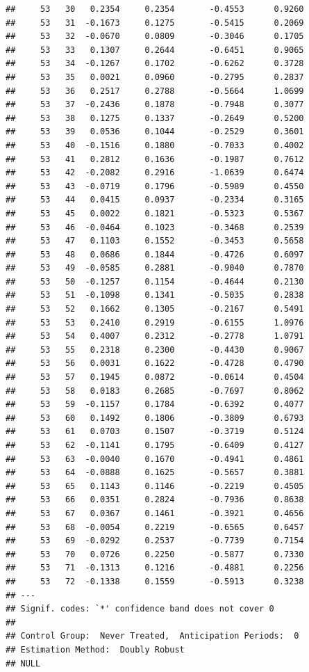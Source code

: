 \documentclass[
]{article}
\begin{document}
\begin{verbatim}
##     53   30   0.2354     0.2354       -0.4553      0.9260  
##     53   31  -0.1673     0.1275       -0.5415      0.2069  
##     53   32  -0.0670     0.0809       -0.3046      0.1705  
##     53   33   0.1307     0.2644       -0.6451      0.9065  
##     53   34  -0.1267     0.1702       -0.6262      0.3728  
##     53   35   0.0021     0.0960       -0.2795      0.2837  
##     53   36   0.2517     0.2788       -0.5664      1.0699  
##     53   37  -0.2436     0.1878       -0.7948      0.3077  
##     53   38   0.1275     0.1337       -0.2649      0.5200  
##     53   39   0.0536     0.1044       -0.2529      0.3601  
##     53   40  -0.1516     0.1880       -0.7033      0.4002  
##     53   41   0.2812     0.1636       -0.1987      0.7612  
##     53   42  -0.2082     0.2916       -1.0639      0.6474  
##     53   43  -0.0719     0.1796       -0.5989      0.4550  
##     53   44   0.0415     0.0937       -0.2334      0.3165  
##     53   45   0.0022     0.1821       -0.5323      0.5367  
##     53   46  -0.0464     0.1023       -0.3468      0.2539  
##     53   47   0.1103     0.1552       -0.3453      0.5658  
##     53   48   0.0686     0.1844       -0.4726      0.6097  
##     53   49  -0.0585     0.2881       -0.9040      0.7870  
##     53   50  -0.1257     0.1154       -0.4644      0.2130  
##     53   51  -0.1098     0.1341       -0.5035      0.2838  
##     53   52   0.1662     0.1305       -0.2167      0.5491  
##     53   53   0.2410     0.2919       -0.6155      1.0976  
##     53   54   0.4007     0.2312       -0.2778      1.0791  
##     53   55   0.2318     0.2300       -0.4430      0.9067  
##     53   56   0.0031     0.1622       -0.4728      0.4790  
##     53   57   0.1945     0.0872       -0.0614      0.4504  
##     53   58   0.0183     0.2685       -0.7697      0.8062  
##     53   59  -0.1157     0.1784       -0.6392      0.4077  
##     53   60   0.1492     0.1806       -0.3809      0.6793  
##     53   61   0.0703     0.1507       -0.3719      0.5124  
##     53   62  -0.1141     0.1795       -0.6409      0.4127  
##     53   63  -0.0040     0.1670       -0.4941      0.4861  
##     53   64  -0.0888     0.1625       -0.5657      0.3881  
##     53   65   0.1143     0.1146       -0.2219      0.4505  
##     53   66   0.0351     0.2824       -0.7936      0.8638  
##     53   67   0.0367     0.1461       -0.3921      0.4656  
##     53   68  -0.0054     0.2219       -0.6565      0.6457  
##     53   69  -0.0292     0.2537       -0.7739      0.7154  
##     53   70   0.0726     0.2250       -0.5877      0.7330  
##     53   71  -0.1313     0.1216       -0.4881      0.2256  
##     53   72  -0.1338     0.1559       -0.5913      0.3238  
## ---
## Signif. codes: `*' confidence band does not cover 0
## 
## Control Group:  Never Treated,  Anticipation Periods:  0
## Estimation Method:  Doubly Robust
## NULL
\end{verbatim}
\end{document}
